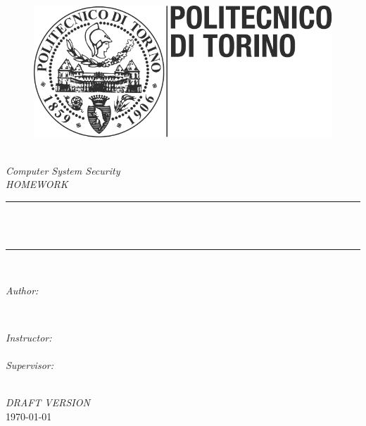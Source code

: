 \begin{titlepage}
\newcommand{\HRule}{\rule{\linewidth}{0.5mm}}

\begin{figure}[!htb]
   \begin{minipage}{\textwidth}
     \centering
     \includegraphics[width=.3\linewidth]{title/polito_logo.png}
   \end{minipage}\hfill
   
\end{figure}

\center 
\quad\\[1.5cm]

\textsl{\Large Computer System Security}\\[1.5cm] 
\textsl{\large HOMEWORK}\\[1.5cm] 
\makeatletter
\HRule \\[0.5cm]
{ \huge \bfseries \@title}\\[0.5cm] 
\HRule \\[1.5cm]
\begin{minipage}{0.4\textwidth}
\begin{flushleft} \large
\emph{Author:}\\
\textup{\@author} 
\end{flushleft}
\end{minipage}
~
\begin{minipage}{0.4\textwidth}
\begin{flushright} \large
\emph{Instructor:} \\
\textup{\instructor} \\
\vspace{1cm}
\emph{Supervisor:} \\
\textup{\supervisor}
\end{flushright}
\end{minipage}\\[3cm]
\makeatother
\vspace{1cm}
\textsl{\large \color{blue} DRAFT VERSION \color{black}}\\[1.5cm] 
{\large \today}\\[2cm] 
\vfill 
\end{titlepage}